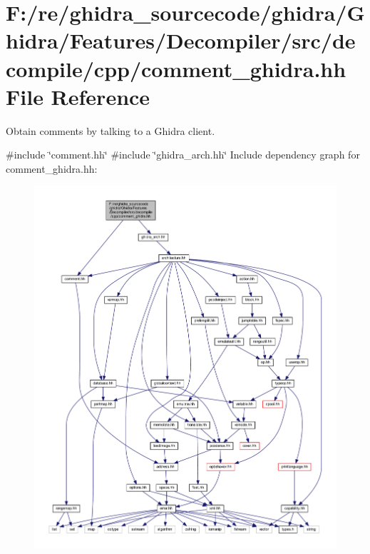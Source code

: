 \hypertarget{comment__ghidra_8hh}{}\section{F\+:/re/ghidra\+\_\+sourcecode/ghidra/\+Ghidra/\+Features/\+Decompiler/src/decompile/cpp/comment\+\_\+ghidra.hh File Reference}
\label{comment__ghidra_8hh}


Obtain comments by talking to a Ghidra client.  


{\ttfamily \#include \char`\"{}comment.\+hh\char`\"{}}\newline
{\ttfamily \#include \char`\"{}ghidra\+\_\+arch.\+hh\char`\"{}}\newline
Include dependency graph for comment\+\_\+ghidra.\+hh\+:
\nopagebreak
\begin{figure}[H]
\begin{center}
\leavevmode
\includegraphics[width=350pt]{comment__ghidra_8hh__incl}
\end{center}
\end{figure}
